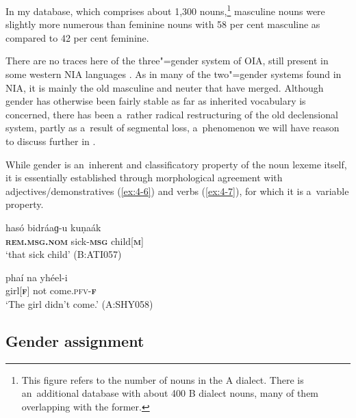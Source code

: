 In my database, which comprises about 1,300 nouns,\footnote{This figure refers to the number of nouns in the A dialect. There is an~additional database with about 400 B dialect nouns, many of them overlapping with the former.} masculine nouns were slightly more numerous than feminine nouns with 58 per cent masculine as compared to 42 per cent feminine.


There are no traces here of the three"=gender system of OIA, still present in some western NIA languages \citep[220--221]{masica1991}. As in many of the two"=gender systems found in NIA, it is mainly the old masculine and neuter that have merged. Although gender has otherwise been fairly stable as far as inherited vocabulary is concerned, there has been a~rather radical restructuring of the old declensional system, partly as a~result of segmental loss, a~phenomenon we will have reason to discuss further in .


While gender is an~inherent and classificatory property of the noun lexeme itself, it is essentially established through morphological agreement with adjectives/demonstratives (\ref{ex:4-6}) and verbs (\ref{ex:4-7}), for which it is a~variable property. 


\begin{exe}
\ex
\label{ex:4-6}
\gll hasó bidráaɡ-u kuṇaák \\
	\textbf{\textsc{rem.msg.nom}} sick-\textbf{\textsc{msg}} child[\textbf{\textsc{m}}] \\
\glt `that sick child' (B:ATI057)
\end{exe}

\begin{exe}
\ex
\label{ex:4-7}
\gll phaí na yhéel-i \\
	girl[\textbf{\textsc{f}}] not come.\textsc{pfv-\textbf{\textsc{f}}} \\
\glt `The girl didn't come.' (A:SHY058)
\end{exe}

\subsection{Gender assignment}
\label{subsec:4-3-1}


